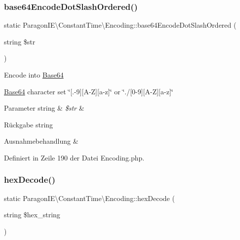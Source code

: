\subsubsection{\texorpdfstring{base64\+Encode\+Dot\+Slash\+Ordered()}{base64EncodeDotSlashOrdered()}}
{\footnotesize\ttfamily static Paragon\+I\+E\textbackslash{}\+Constant\+Time\textbackslash{}\+Encoding\+::base64\+Encode\+Dot\+Slash\+Ordered (\begin{DoxyParamCaption}\item[{string}]{\$str }\end{DoxyParamCaption})\hspace{0.3cm}{\ttfamily [static]}}

Encode into \mbox{\hyperlink{class_paragon_i_e_1_1_constant_time_1_1_base64}{Base64}}

\mbox{\hyperlink{class_paragon_i_e_1_1_constant_time_1_1_base64}{Base64}} character set \char`\"{}\mbox{[}.-\/9\mbox{]}\mbox{[}\+A-\/\+Z\mbox{]}\mbox{[}a-\/z\mbox{]}\char`\"{} or \char`\"{}./\mbox{[}0-\/9\mbox{]}\mbox{[}\+A-\/\+Z\mbox{]}\mbox{[}a-\/z\mbox{]}\char`\"{} 
\begin{DoxyParams}[1]{Parameter}
string & {\em \$str} & \\
\hline
\end{DoxyParams}
\begin{DoxyReturn}{Rückgabe}
string 
\end{DoxyReturn}

\begin{DoxyExceptions}{Ausnahmebehandlung}
{\em } & \\
\hline
\end{DoxyExceptions}


Definiert in Zeile 190 der Datei Encoding.\+php.

\mbox{\label{class_paragon_i_e_1_1_constant_time_1_1_encoding_af6cf7e27c63b8c2241b05c21f3ce13bf}} 
\subsubsection{\texorpdfstring{hex\+Decode()}{hexDecode()}}
{\footnotesize\ttfamily static Paragon\+I\+E\textbackslash{}\+Constant\+Time\textbackslash{}\+Encoding\+::hex\+Decode (\begin{DoxyParamCaption}\item[{string}]{\$hex\+\_\+string }\end{DoxyParamCaption})\hspace{0.3cm}{\ttfamily [static]}}


